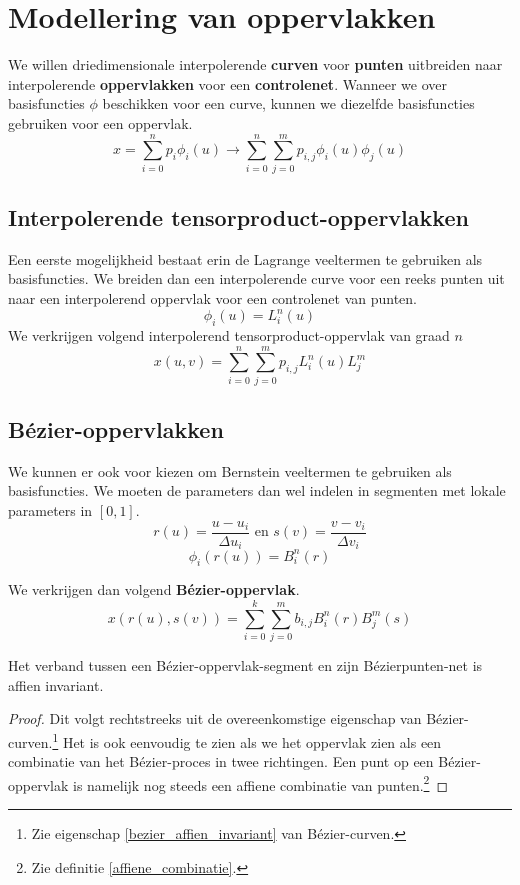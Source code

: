 \documentclass[computergesteund_ontwerp_van_curven_en_oppervlakken.tex]{subfiles}
\begin{document}
\chapter{Modellering van oppervlakken}
We willen driedimensionale interpolerende \textbf{curven} voor \textbf{punten} uitbreiden naar interpolerende \textbf{oppervlakken} voor een \textbf{controlenet}.
Wanneer we over basisfuncties $\phi$ beschikken voor een curve, kunnen we diezelfde basisfuncties gebruiken voor een oppervlak.
\[
x = \sum_{i=0}^{n}p_i\phi_{i}(u) \longrightarrow \sum_{i=0}^{n}\sum_{j=0}^{m}p_{i,j}\phi_{i}(u)\phi_{j}(u)
\]

\section{Interpolerende  tensorproduct-oppervlakken}
Een eerste mogelijkheid bestaat erin de Lagrange veeltermen te gebruiken als basisfuncties. We breiden dan een interpolerende curve voor een reeks punten uit naar een interpolerend oppervlak voor een controlenet van punten.
\[
\phi_{i}(u) = L_{i}^{n}(u)
\]
We verkrijgen volgend interpolerend tensorproduct-oppervlak van graad $n$
\[
x(u,v) = \sum_{i=0}^{n}\sum_{j=0}^{m}p_{i,j}L_{i}^{n}(u)L_{j}^{m}
\]

\section{B\'ezier-oppervlakken}
We kunnen er ook voor kiezen om Bernstein veeltermen te gebruiken als basisfuncties. 
We moeten de parameters dan wel indelen in segmenten met lokale parameters in $[0,1]$.
\[
r(u) = \frac{u-u_i}{\Delta u_i} \text{ en } s(v) = \frac{v-v_i}{\Delta v_i}
\]
\[
\phi_{i}(r(u)) = B_{i}^{n}(r)
\]
\begin{de}
We verkrijgen dan volgend \textbf{B\'ezier-oppervlak}.
\[
x(r(u),s(v)) = \sum_{i=0}^{k}\sum_{j=0}^{m}b_{i,j}B_{i}^{n}(r)B_{j}^{m}(s)
\]
\end{de}

\begin{ei}
Het verband tussen een B\'ezier-oppervlak-segment en zijn B\'ezierpunten-net is affien invariant.
\begin{proof}
Dit volgt rechtstreeks uit de overeenkomstige eigenschap van B\'ezier-curven.\footnote{Zie eigenschap \ref{bezier_affien_invariant} van B\'ezier-curven.} Het is ook eenvoudig te zien als we het oppervlak zien als een combinatie van het B\'ezier-proces in twee richtingen. Een punt op een B\'ezier-oppervlak is namelijk nog steeds een affiene combinatie van punten.\footnote{Zie definitie \ref{affiene_combinatie}.}
\end{proof}
\end{ei}
\end{document}
